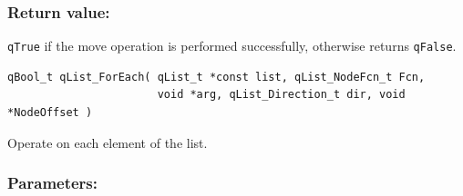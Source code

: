 \documentclass{article}
\begin{document}
\subsubsection*{Return value:}
\lstinline{qTrue} if the move operation is performed successfully, otherwise  returns \lstinline{qFalse}.  

\noindent\hrulefill

\begin{lstlisting}[style=CStyle]
qBool_t qList_ForEach( qList_t *const list, qList_NodeFcn_t Fcn, 
                       void *arg, qList_Direction_t dir, void *NodeOffset )
\end{lstlisting} 

Operate on each element of the list.

\subsubsection*{Parameters:}
\end{document}
